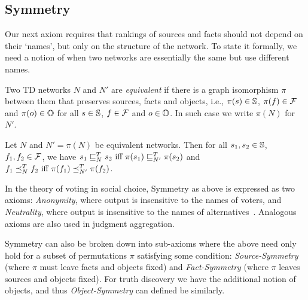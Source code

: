 \subsection{Symmetry}

Our next axiom requires that rankings of sources and facts should not depend on
their `names', but only on the structure of the network. To state it formally,
we need a notion of when two networks are essentially the same but use
different names.

\begin{definition}
Two TD networks $N$ and $N'$ are \emph{equivalent} if there is a
graph isomorphism $\pi$ between them that preserves sources, facts and objects,
i.e., $\pi(s) \in \S$, $\pi(f) \in \F$ and $\pi(o) \in \O$ for all $s \in \S$,
$f \in \F$ and $o \in \O$. In such case we write $\pi(N)$ for $N'$.
\end{definition}

\begin{axiom}[Symmetry]
Let $N$ and $N' = \pi(N)$ be equivalent networks. Then for all $s_1, s_2 \in
\S$, $f_1, f_2 \in \F$, we have
    $s_1 \sle_N^T s_2\ \textrm{iff } \pi(s_1) \sle_{N'}^T \pi(s_2)$
and
    $f_1 \fle_N^T f_2\ \textrm{iff } \pi(f_1) \fle_{N'}^T \pi(f_2)$.

\end{axiom}

In the theory of voting in social choice, Symmetry as above is expressed as two
axioms: \emph{Anonymity}, where output is insensitive to the names of voters,
and \emph{Neutrality}, where output is insensitive to the names of
alternatives~\cite{zwicker2016voting}. Analogous axioms are also used in
judgment aggregation.

Symmetry can also be broken down into sub-axioms where the above
need only hold for a subset of permutations $\pi$ satisfying some condition:
\emph{Source-Symmetry} (where $\pi$ must leave facts and objects fixed) and
\emph{Fact-Symmetry} (where $\pi$ leaves sources and objects fixed). For truth
discovery we have the additional notion of objects, and thus
\emph{Object-Symmetry} can defined be similarly.


